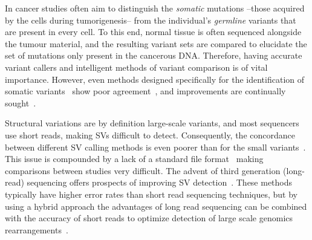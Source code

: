 \begin{justify}
In cancer studies often aim to distinguish the \emph{somatic} mutations --those acquired by the cells during tumorigenesis-- from the individual's \emph{germline} variants that are present in every cell. To this end, normal tissue is often sequenced alongside the tumour material, and the resulting variant sets are compared to elucidate the set of mutations only present in the cancerous DNA\@. Therefore, having accurate variant callers and intelligent methods of variant comparison is of vital importance. However, even methods designed specifically for the identification of somatic variants~\cite{xu2014comparison,kim2013comparing,roberts2013comparative} show poor agreement~\cite{alioto2015comprehensive, kroigaard2016evaluation, orawe2013}, and improvements are continually sought~\cite{callari2017,vijayan2017}.

Structural variations are by definition large-scale variants, and most sequencers use short reads, making SVs difficult to detect. Consequently, the concordance between different SV calling methods is even poorer than for the small variants~\cite{sedlazeck2017}. This issue is compounded by a lack of a standard file format~\cite{scherer2007} making comparisons between studies very difficult. The advent of third generation (long-read) sequencing offers prospects of improving SV detection~\cite{sedlazeck2018,merker2017}. These methods typically have higher error rates than short read sequencing techniques, but by using a hybrid approach the advantages of long read sequencing can be combined with the accuracy of short reads to optimize detection of large scale genomics rearrangements~\cite{fan2017hysa,weissensteiner2017, miller2017, ritz2014}.


\end{justify}
